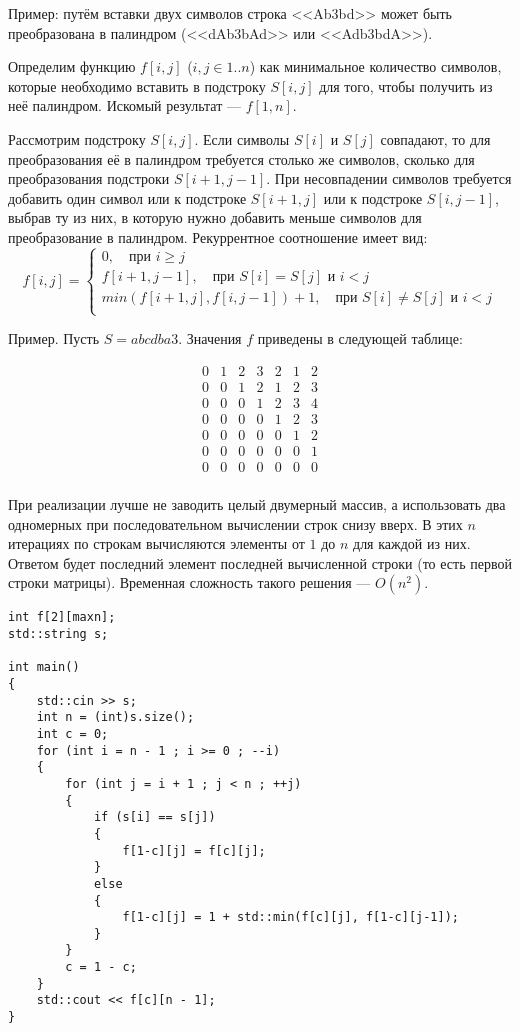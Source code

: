 \documentclass[14pt,openany]{book}
\begin{document}
Пример: путём вставки двух символов строка <<Ab3bd>> может быть преобразована
в палиндром (<<dAb3bAd>> или <<Adb3bdA>>).

Определим функцию $f[i,j]$ ($i, j \in 1..n$) как минимальное количество символов, которые
необходимо вставить в подстроку $S[i,j]$ для того, чтобы получить из неё палиндром.
Искомый результат --- $f[1,n]$.

Рассмотрим подстроку $S[i,j]$. Если символы $S[i]$ и $S[j]$ совпадают, то для преобразования её
в палиндром требуется столько же символов, сколько для преобразования подстроки $S[i+1,j-1]$.
При несовпадении символов требуется добавить один символ или к подстроке $S[i+1,j]$ или 
к подстроке $S[i,j-1]$, выбрав ту из них, в которую нужно добавить меньше символов для
преобразование в палиндром.
Рекуррентное соотношение имеет вид:
$$
  f[i,j] = \left\{\begin{array}{l}
      0, \quad \text{при $i \ge j$} \\
      f[i+1, j-1], \quad \text{при $S[i] = S[j]$ и $i < j$} \\
      min(f[i+1,j], f[i, j-1]) + 1, \quad \text{при $S[i] \neq S[j]$ и $i < j$} \\
  \end{array}\right.
$$

Пример. Пусть $S = abcdba3$. Значения $f$ приведены в следующей таблице:

$$\begin{array}{ccccccc}
0 & 1 & 2 & 3 & 2 & 1 & 2 \\
0 & 0 & 1 & 2 & 1 & 2 & 3 \\
0 & 0 & 0 & 1 & 2 & 3 & 4 \\
0 & 0 & 0 & 0 & 1 & 2 & 3 \\
0 & 0 & 0 & 0 & 0 & 1 & 2 \\
0 & 0 & 0 & 0 & 0 & 0 & 1 \\
0 & 0 & 0 & 0 & 0 & 0 & 0 \\
\end{array}$$

При реализации лучше не заводить целый двумерный массив, а использовать два
одномерных при последовательном вычислении строк снизу вверх.
В этих $n$ итерациях по строкам вычисляются элементы от $1$ до $n$ для каждой из них.
Ответом будет последний элемент последней вычисленной строки (то есть первой строки
матрицы). Временная сложность такого решения --- $O(n^2)$.

\begin{lstlisting}
int f[2][maxn];
std::string s;

int main()
{
    std::cin >> s;
    int n = (int)s.size();
    int c = 0;
    for (int i = n - 1 ; i >= 0 ; --i)
    {
        for (int j = i + 1 ; j < n ; ++j)
        {
            if (s[i] == s[j])
            {
                f[1-c][j] = f[c][j];
            }
            else
            {
                f[1-c][j] = 1 + std::min(f[c][j], f[1-c][j-1]);
            }
        }
        c = 1 - c;
    }
    std::cout << f[c][n - 1];
}
\end{lstlisting}
\end{document}
